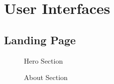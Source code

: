 \documentclass[oneside,a4paper,12pt,explicit]{book}
\begin{document}
\section{User Interfaces}
\subsection{Landing Page}
\begin{figure}[H]
    \centering
    \begin{minipage}{0.4\textwidth}
        \centering
        \caption{Hero Section}
    \end{minipage}
    \hfill
    \begin{minipage}{0.5\textwidth}
        \centering
        \caption{About Section}
    \end{minipage}
\end{figure}
\end{document}
